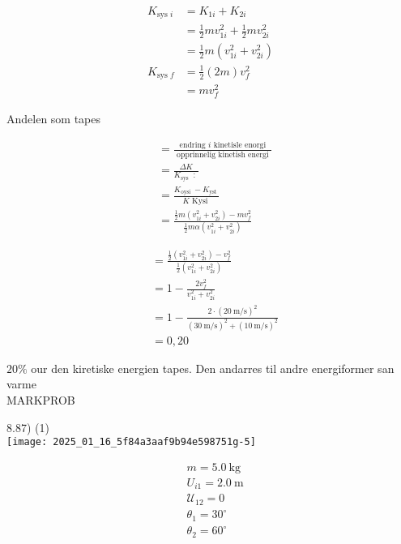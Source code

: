 \documentclass[10pt]{article}
\begin{document}
$$
\begin{aligned}
K_{\text {sys } i} & =K_{1 i}+K_{2 i} \\
& =\frac{1}{2} m v_{1 i}^{2}+\frac{1}{2} m v_{2 i}^{2} \\
& =\frac{1}{2} m\left(v_{1 i}^{2}+v_{2 i}^{2}\right) \\
K_{\text {sys } f} & =\frac{1}{2}(2 m) v_{f}^{2} \\
& =m v_{f}^{2}
\end{aligned}
$$

Andelen som tapes

$$
\begin{aligned}
& =\frac{\text { endring } i \text { kinetisle enorgi }}{\text { opprinnelig kinetish energi }} \\
& =\frac{\Delta K}{K_{\text {sys }} \text { : }} \\
& =\frac{K_{\text {oysi }}-K_{\text {yst }}}{K \text { Kysi }} \\
& =\frac{\frac{1}{2} m\left(v_{1 i}^{2}+v_{2 i}^{2}\right)-m v_{f}^{2}}{\frac{1}{2} m \alpha\left(v_{1 i}^{2}+v_{2 i}^{2}\right)}
\end{aligned}
$$

$$
\begin{aligned}
& =\frac{\frac{1}{2}\left(v_{1 i}^{2}+v_{2 i}^{2}\right)-v_{f}^{2}}{\frac{1}{2}\left(v_{1 i}^{2}+v_{2 i}^{2}\right)} \\
& =1-\frac{2 v_{f}^{2}}{v_{1 i}^{2}+v_{2 i}^{2}} \\
& =1-\frac{2 \cdot(20 \mathrm{~m} / \mathrm{s})^{2}}{(30 \mathrm{~m} / \mathrm{s})^{2}+(10 \mathrm{~m} / \mathrm{s})^{2}} \\
& =0,20
\end{aligned}
$$

$20 \%$ our den kiretiske energien tapes. Den andarres til andre energiformer san varme\\

MARKPROB

8.87) (1)\\
\texttt{[image: 2025\_01\_16\_5f84a3aaf9b94e598751g-5]}

$$
\begin{aligned}
& m=5.0 \mathrm{~kg} \\
& U_{i 1}=2.0 \mathrm{~m} \\
& \mathcal{U}_{12}=0 \\
& \theta_{1}=30^{\circ} \\
& \theta_{2}=60^{\circ}
\end{aligned}
$$
\end{document}
